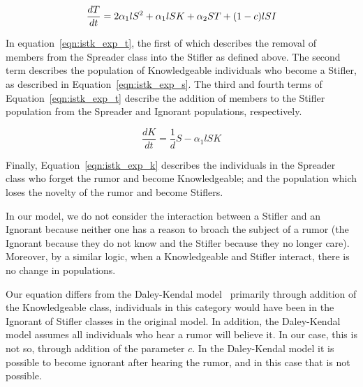\begin{equation}
\label{eqn:istk_exp_t} \frac{dT}{dt} = 2 \alpha_1l S^2 + \alpha_1l SK + \alpha_2 ST + (1-c)lSI \\
\end{equation}

In equation~\ref{eqn:istk_exp_t}, the first of which describes the removal of members from the Spreader class into the Stifler as defined above.
The second term describes the population of Knowledgeable individuals who become a Stifler, as described in Equation~\ref{eqn:istk_exp_s}.
The third and fourth terms of Equation~\ref{eqn:istk_exp_t} describe the addition of members to the Stifler population from the Spreader and Ignorant populations, respectively.

\begin{equation}
\label{eqn:istk_exp_k} \frac{dK}{dt} = \frac{1}{d}S - \alpha_1l SK
\end{equation}

Finally, Equation~\ref{eqn:istk_exp_k} describes the individuals in the Spreader class who forget the rumor and become Knowledgeable; and the population which loses the novelty of the rumor and become Stiflers.

In our model, we do not consider the interaction between a Stifler and an Ignorant because neither one has a reason to broach the subject of a rumor (the Ignorant because they do not know and the Stifler because they no longer care).
Moreover, by a similar logic, when a Knowledgeable and Stifler interact, there is no change in populations.


Our equation differs from the Daley-Kendal model~\cite{daley-1965} primarily through addition of the Knowledgeable class, individuals in this category would have been in the Ignorant of Stifler classes in the original model.
In addition, the Daley-Kendal model assumes all individuals who hear a rumor will believe it.
In our case, this is not so, through addition of the parameter $ c $.
In the Daley-Kendal model it is possible to become ignorant after hearing the rumor, and in this case that is not possible.
